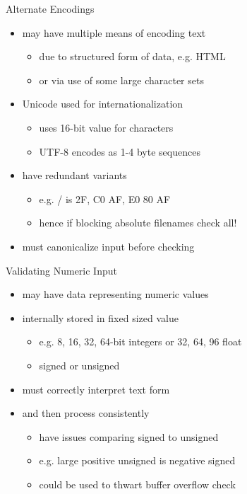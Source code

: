\documentclass{beamer}
\begin{document}
\begin{frame}{Alternate Encodings}
  \begin{itemize}
  \item may have multiple means of encoding text
  \begin{itemize}
    \item due to structured form of data, e.g. HTML
    \item or via use of some large character sets
  \end{itemize}
  \item Unicode used for internationalization
  \begin{itemize}
    \item uses 16-bit value for characters
    \item UTF-8 encodes as 1-4 byte sequences
  \end{itemize}
  \item have redundant variants
  \begin{itemize}
    \item e.g. / is 2F, C0 AF, E0 80 AF
    \item hence if blocking absolute filenames check all!
  \end{itemize}
  \item must canonicalize input before checking 
  \end{itemize}
\end{frame}



\begin{frame}{Validating Numeric Input}
  \begin{itemize}
  \item may have data representing numeric values
  \item internally stored in fixed sized value
  \begin{itemize}
    \item e.g. 8, 16, 32, 64-bit integers or 32, 64, 96 float
    \item signed or unsigned
  \end{itemize}
  \item must correctly interpret text form
  \item and then process consistently
  \begin{itemize}
    \item have issues comparing signed to unsigned
    \item e.g. large positive unsigned is negative signed
    \item could be used to thwart buffer overflow check 
  \end{itemize}
  \end{itemize}
\end{frame}
\end{document}

